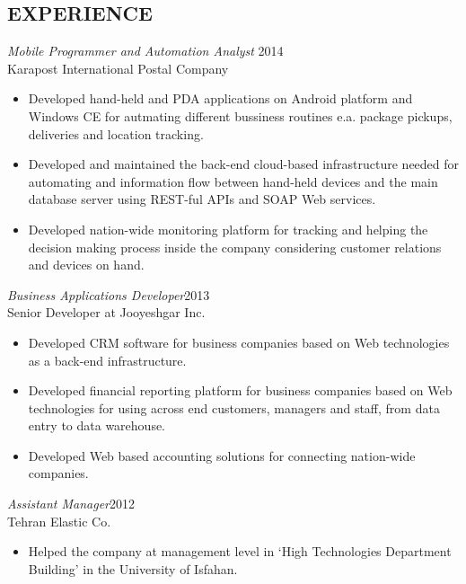 \documentclass[margin, 10pt]{res} %
\begin{document}
\begin{resume}
 
\section{EXPERIENCE}

{\sl Mobile Programmer and Automation Analyst} \hfill 2014 \\
Karapost International Postal Company

\begin{itemize} \itemsep -2pt %
\item Developed hand-held and PDA applications on Android platform and Windows CE for autmating different bussiness
  routines e.a. package pickups, deliveries and location tracking.
\item Developed and maintained the back-end cloud-based infrastructure needed for automating and information flow between
  hand-held devices and the main database server using REST-ful APIs and SOAP Web services.
\item Developed nation-wide monitoring platform for tracking and helping the
  decision making process inside the company considering customer relations and devices on hand.
\end{itemize}
 
{\sl Business Applications Developer}\hfill 2013 \\
Senior Developer at Jooyeshgar Inc.
\begin{itemize} 
\item Developed CRM software for business companies based on Web technologies as a back-end infrastructure.
\item Developed financial reporting platform for business companies based on Web
  technologies for using across end customers, managers and staff, from data entry
  to data warehouse.
\item Developed Web based accounting solutions for connecting nation-wide companies.
\end{itemize} 

{\sl Assistant Manager}\hfill 2012 \\
Tehran Elastic Co.
\begin{itemize}
\item Helped the company at management level in `High Technologies Department
  Building' in the University of Isfahan.
\end{itemize} 


\end{resume}
\end{document}
